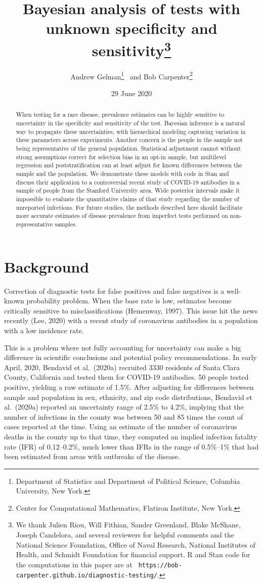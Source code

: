 \documentclass[11pt]{article}
\title{\bf Bayesian analysis of tests with unknown specificity and
  sensitivity\footnote{We thank Julien Riou, Will Fithian, Sander
    Greenland, Blake McShane, Joseph Candelora, and several reviewers
    for helpful comments and the National Science Foundation, Office
    of Naval Research, National Institutes of Health, and Schmidt
    Foundation for financial support.  R and Stan code for the
    computations in this paper are at {\tt
      https://bob-carpenter.github.io/diagnostic-testing/}.}\vspace{.1in}}
\author{Andrew Gelman\footnote{Department of Statistics and Department
    of Political Science, Columbia University, New York.}  \ and Bob
  Carpenter\footnote{Center for Computational Mathematics, Flatiron
    Institute, New York.}  \vspace{.1in}}
\date{29 June 2020}
\begin{document}
\sloppy
\maketitle

\begin{abstract}
\noindent
When testing for a rare disease, prevalence estimates can be highly
sensitive to uncertainty in the specificity and sensitivity of the
test.  Bayesian inference is a natural way to propagate these
uncertainties, with hierarchical modeling capturing variation in these
parameters across experiments.  Another concern is the people in the
sample not being representative of the general population.
Statistical adjustment cannot without strong assumptions correct for
selection bias in an opt-in sample, but multilevel regression and
poststratification can at least adjust for known differences between
the sample and the population.  We demonstrate these models with code
in Stan and discuss their application to a controversial recent study
of COVID-19 antibodies in a sample of people from the Stanford
University area.  Wide posterior intervals make it impossible to
evaluate the quantitative claims of that study regarding the number of
unreported infections.  For future studies, the methods described here
should facilitate more accurate estimates of disease prevalence from
imperfect tests performed on non-representative samples.
\end{abstract}

\section{Background}

Correction of diagnostic tests for false positives and false negatives
is a well-known probability problem.  When the base rate is low,
estimates become critically sensitive to misclassifications (Hemenway,
1997).  This issue hit the news recently (Lee, 2020) with a recent
study of coronavirus antibodies in a population with a low incidence
rate.

This is a problem where not fully accounting for uncertainty can make
a big difference in scientific conclusions and potential policy
recommendations.  In early April, 2020, Bendavid et al.\ (2020a)
recruited 3330 residents of Santa Clara County, California and tested
them for COVID-19 antibodies.  50 people tested positive, yielding a
raw estimate of 1.5\%.  After adjusting for differences between sample
and population in sex, ethnicity, and zip code distributions, Bendavid
et al.\ (2020a) reported an uncertainty range of 2.5\% to 4.2\%,
implying that the number of infections in the county was between 50
and 85 times the count of cases reported at the time.  Using an
estimate of the number of coronavirus deaths in the county up to that
time, they computed an implied infection fatality rate (IFR) of
0.12--0.2\%, much lower than IFRs in the range of 0.5\%--1\% that had
been estimated from areas with outbreaks of the disease.
\end{document}
